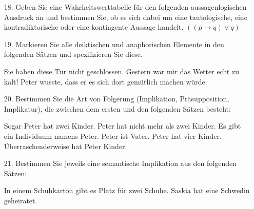 \begin{frame}

\begin{itemize}
	
	\item[18.] Geben Sie eine Wahrheitswerttabelle für den folgenden aussagenlogischen Ausdruck an und bestimmen Sie, ob es sich dabei um eine tautologische, eine kontradiktorische oder eine kontingente Aussage handelt.
	\ea $((p \rightarrow q) \lor q)$
	\z 
	
	\item[19.] Markieren Sie alle deiktischen und anaphorischen Elemente in den folgenden Sätzen und spezifizieren Sie diese.
	
	\eal
	\ex Sie haben diese Tür nicht geschlossen.
	\ex Gestern war mir das Wetter echt zu kalt!
	\ex Peter wusste, dass er es sich dort gemütlich machen würde. 
	\zl
	
\end{itemize}

\end{frame}


\begin{frame}

\begin{itemize}
	\item[20.] Bestimmen Sie die Art von Folgerung (Implikation, Präsupposition, Implikatur), die zwischen dem ersten und den folgenden Sätzen besteht:
	
	\ea Sogar Peter hat zwei Kinder. 
	\ea Peter hat nicht mehr als zwei Kinder.
	\ex Es gibt ein Individuum namens Peter.
	\ex Peter ist Vater.
	\ex Peter hat vier Kinder.
	\ex Überraschenderweise hat Peter Kinder.
	\z
	\z 
	
	\item[21.] Bestimmen Sie jeweils eine semantische Implikation aus den folgenden Sätzen:
	
	\eal
	\ex In einem Schuhkarton gibt es Platz für zwei Schuhe.
	\ex Saskia hat eine Schwedin geheiratet.
	\zl
		
\end{itemize}

\end{frame}


